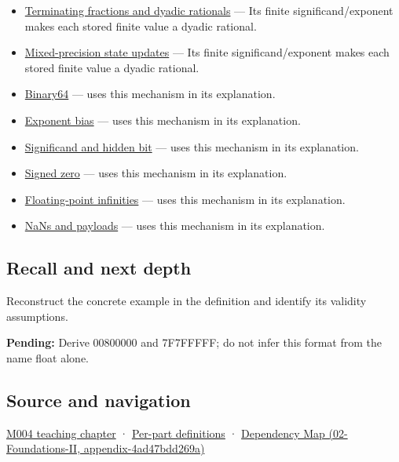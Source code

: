 \begin{itemize}
\item
  \hyperref[appendix-2a2f1b74bdd3]{Terminating fractions and dyadic rationals} --- Its finite significand/exponent makes each stored finite value a dyadic rational.
\item
  \hyperref[appendix-260182e617b7]{Mixed-precision state updates} --- Its finite significand/exponent makes each stored finite value a dyadic rational.
\item
  \hyperref[appendix-5078dfab64e6]{Binary64} --- uses this mechanism in its explanation.
\item
  \hyperref[appendix-2fae058c82e1]{Exponent bias} --- uses this mechanism in its explanation.
\item
  \hyperref[appendix-a24fd710cf67]{Significand and hidden bit} --- uses this mechanism in its explanation.
\item
  \hyperref[appendix-3a048f032c1f]{Signed zero} --- uses this mechanism in its explanation.
\item
  \hyperref[appendix-eb336149c00a]{Floating-point infinities} --- uses this mechanism in its explanation.
\item
  \hyperref[appendix-d6607cc4c235]{NaNs and payloads} --- uses this mechanism in its explanation.
\end{itemize}

\subsection{Recall and next depth}\label{appendix-5057f9ad327f-recall-and-next-depth}

Reconstruct the concrete example in the definition and identify its validity assumptions.

\textbf{Pending:} Derive 00800000 and 7F7FFFFF; do not infer this format from the name float alone.

\subsection{Source and navigation}\label{appendix-5057f9ad327f-source-and-navigation}

\hyperref[01-foundations-i-ch001-a-stretching-ruler-for-real-valued-quantities]{M004 teaching chapter} · \hyperref[appendix-fd090d982a15-m004---parts-61-76]{Per-part definitions} · \href{../02-Foundations-II/main.pdf\#nameddest=appendix-4ad47bdd269a}{Dependency Map (02-Foundations-II, appendix-4ad47bdd269a)}
